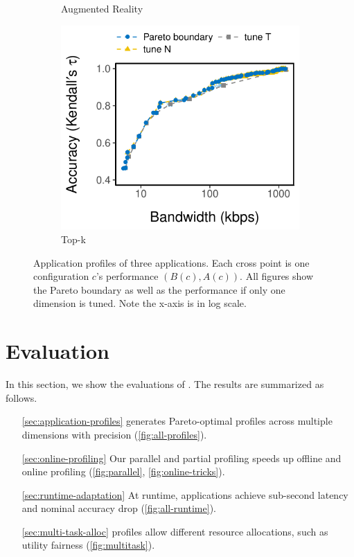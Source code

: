 \begin{figure}[htb]
\begin{subfigure}[t]{0.33\textwidth}
    \caption{Augmented Reality}
    \label{fig:ar-profile}
  \end{subfigure}
  \hfill
  \begin{subfigure}[t]{0.33\textwidth}
    \centering
    \includegraphics[width=\textwidth]{figures/profile-topk.pdf}
    \caption{Top-k}
    \label{fig:tk-profile}
  \end{subfigure}
  \caption{Application profiles of three applications. Each cross point is one
    configuration $c$'s performance $(B(c), A(c))$. All figures show the Pareto
    boundary as well as the performance if only one dimension is tuned. Note the
    x-axis is in log scale.}
  \label{fig:all-profiles}
\end{figure}

\newpage

\section{Evaluation}
\label{sec:evaluation}

In this section, we show the evaluations of \sysname{}. The results are
summarized as follows.

\begin{itemize}
\item[\autoref{sec:application-profiles}] \sysname{} generates Pareto-optimal
  profiles across multiple dimensions with precision
  (\autoref{fig:all-profiles}).
\item[\autoref{sec:online-profiling}] Our parallel and partial profiling speeds
  up offline and online profiling (\autoref{fig:parallel},
  \autoref{fig:online-tricks}).
\item[\autoref{sec:runtime-adaptation}] At runtime, \sysname{} applications
  achieve sub-second latency and nominal accuracy drop
  (\autoref{fig:all-runtime}).
\item[\autoref{sec:multi-task-alloc}] \sysname{} profiles allow different
  resource allocations, such as utility fairness (\autoref{fig:multitask}).
\end{itemize}

